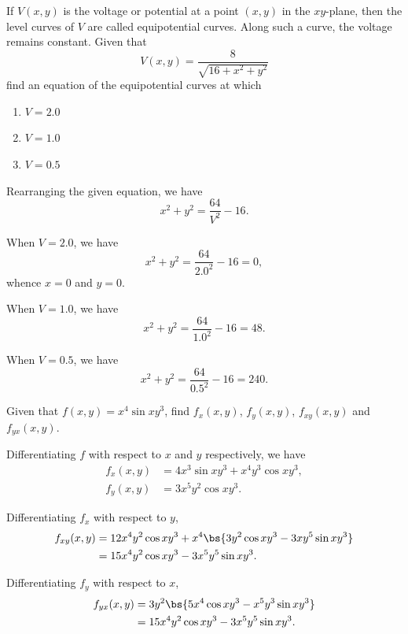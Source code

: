 \begin{problem}
    If $V(x, y)$ is the voltage or potential at a point $(x, y)$ in the $xy$-plane, then the level curves of $V$ are called equipotential curves. Along such a curve, the voltage remains constant. Given that \[V(x, y) = \frac{8}{\sqrt{16 + x^2 + y^2}}\] find an equation of the equipotential curves at which
    \begin{enumerate}
        \item $V = 2.0$
        \item $V = 1.0$
        \item $V = 0.5$
    \end{enumerate}
\end{problem}
\begin{solution}
    Rearranging the given equation, we have \[x^2 + y^2 = \frac{64}{V^2} - 16.\]

    \begin{ppart}
        When $V = 2.0$, we have \[x^2 + y^2 = \frac{64}{2.0^2} - 16 = 0,\] whence $x = 0$ and $y = 0$.
    \end{ppart}
    \begin{ppart}
        When $V = 1.0$, we have \[x^2 + y^2 = \frac{64}{1.0^2} - 16 = 48.\]
    \end{ppart}
    \begin{ppart}
        When $V = 0.5$, we have \[x^2 + y^2 = \frac{64}{0.5^2} - 16 = 240.\]
    \end{ppart}
\end{solution}

\begin{problem}
    Given that $f(x, y) = x^4 \sin{xy^3}$, find $f_x(x, y)$, $f_y(x, y)$, $f_{xy}(x, y)$ and $f_{yx}(x, y)$.
\end{problem}
\begin{solution}
    Differentiating $f$ with respect to $x$ and $y$ respectively, we have
    \begin{align*}
        f_x(x, y) &= 4x^3 \sin{xy^3} + x^4 y^3 \cos{xy^3},\\
        f_y(x, y) &= 3x^5y^2\cos{xy^3}.
    \end{align*}

    Differentiating $f_x$ with respect to $y$, 
    \begin{align*}
        f_{xy}(x, y) &= 12x^4y^2\cos{xy^3} + x^4\bs{3y^2\cos{xy^3} - 3xy^5\sin{xy^3}}\\
        &= 15x^4y^2\cos{xy^3} - 3x^5y^5\sin{xy^3}.
    \end{align*}

    Differentiating $f_y$ with respect to $x$,
    \begin{align*}
        f_{yx}(x, y) &= 3y^2\bs{5x^4 \cos{xy^3} - x^5y^3\sin{xy^3}}\\
        &= 15x^4y^2 \cos{xy^3} - 3x^5y^5 \sin{xy^3}.
    \end{align*}
\end{solution}

